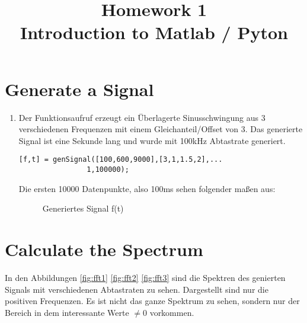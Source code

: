 \documentclass[conference]{IEEEtran}
\begin{document}
%
%
\title{Homework 1\\ Introduction to Matlab / Pyton}

\author{
}


\maketitle

\IEEEpeerreviewmaketitle

\section{Generate a Signal}

\begin{enumerate}
\item Der Funktionsaufruf erzeugt ein Überlagerte Sinusschwingung aus 3 verschiedenen Frequenzen mit einem Gleichanteil/Offset von 3. Das generierte Signal ist eine Sekunde lang und wurde mit 100kHz Abtastrate generiert.

\begin{lstlisting}
[f,t] = genSignal([100,600,9000],[3,1,1.5,2],...
				1,100000);
\end{lstlisting}
Die ersten 10000 Datenpunkte, also 100ms sehen folgender maßen aus:
\begin{figure}[h!]
  	\centering
    \scalebox{.7}{}
    \caption{Generiertes Signal f(t)}
    \label{fig:sig}
\end{figure}
\end{enumerate}

\section{Calculate the Spectrum}
In den Abbildungen \ref{fig:fft1} \ref{fig:fft2} \ref{fig:fft3} sind die Spektren des genierten Signals mit verschiedenen Abtastraten zu sehen. Dargestellt sind nur die positiven Frequenzen. Es ist nicht das ganze Spektrum zu sehen, sondern nur der Bereich in dem interessante Werte $\neq 0$ vorkommen.
\end{document}
